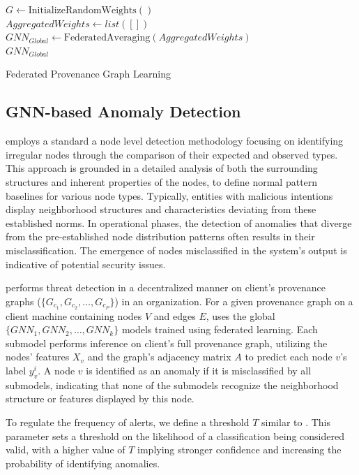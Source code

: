 \begin{algorithm}[!t]
  \scriptsize
  \DontPrintSemicolon
  \BlankLine
  $G \leftarrow \text{InitializeRandomWeights}()$\\
  \BlankLine
  $AggregatedWeights \leftarrow list([])$\\
  $GNN_{Global} \leftarrow \text{FederatedAveraging}(AggregatedWeights)$\\
  \BlankLine
  \Return $GNN_{Global}$\\
  \BlankLine
  \caption{Federated Provenance Graph Learning}
  \label{alg:federated_learning}
\end{algorithm}

\subsection{GNN-based Anomaly Detection}
\label{sys:anomaly_detection}

\Sys employs a standard a node level detection methodology focusing on identifying irregular nodes through the comparison of their expected and observed types. This approach is grounded in a detailed analysis of both the surrounding structures and inherent properties of the nodes, to define normal pattern baselines for various node types. Typically, entities with malicious intentions display neighborhood structures and characteristics deviating from these established norms. In operational phases, the detection of anomalies that diverge from the pre-established node distribution patterns often results in their misclassification. The emergence of nodes misclassified in the system's output is indicative of potential security issues.

\Sys performs threat detection in a decentralized manner on client's provenance graphs (\( \{G_{c_1}, G_{c_2}, \ldots, G_{c_P}\} \)) in an organization. For a given provenance graph on a client machine containing nodes \(V\) and edges \(E\), \Sys uses the global \(\{GNN_1, GNN_2, \ldots, GNN_k\}\) \gnnshort models trained using federated learning. Each submodel performs inference on client's full provenance graph, utilizing the nodes' features \(X_v\) and the graph's adjacency matrix \(A\) to predict each node \(v\)'s label \(y_v^i\). A node \(v\) is identified as an anomaly if it is misclassified by all submodels, indicating that none of the submodels recognize the neighborhood structure or features displayed by this node. 

To regulate the frequency of alerts, we define a threshold \(T\) similar to \flash. This parameter sets a threshold on the likelihood of a classification being considered valid, with a higher value of \(T\) implying stronger confidence and increasing the probability of identifying anomalies. 